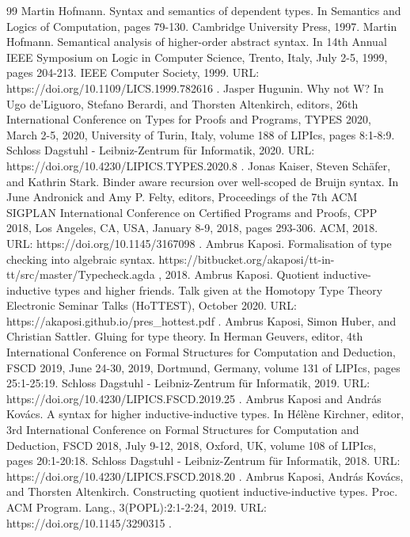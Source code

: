\documentclass[10pt,a4paper]{amsart}
\begin{document}
\begin{thebibliography}{99}
 Martin Hofmann. Syntax and semantics of dependent types. In Semantics and Logics of Computation, pages 79-130. Cambridge University Press, 1997.
 Martin Hofmann. Semantical analysis of higher-order abstract syntax. In 14th Annual IEEE Symposium on Logic in Computer Science, Trento, Italy, July 2-5, 1999, pages 204-213. IEEE Computer Society, 1999. URL: https://doi.org/10.1109/LICS.1999.782616 .
 Jasper Hugunin. Why not W? In Ugo de'Liguoro, Stefano Berardi, and Thorsten Altenkirch, editors, 26th International Conference on Types for Proofs and Programs, TYPES 2020, March 2-5, 2020, University of Turin, Italy, volume 188 of LIPIcs, pages 8:1-8:9. Schloss Dagstuhl - Leibniz-Zentrum für Informatik, 2020. URL: https://doi.org/10.4230/LIPICS.TYPES.2020.8 .
 Jonas Kaiser, Steven Schäfer, and Kathrin Stark. Binder aware recursion over well-scoped de Bruijn syntax. In June Andronick and Amy P. Felty, editors, Proceedings of the 7th ACM SIGPLAN International Conference on Certified Programs and Proofs, CPP 2018, Los Angeles, CA, USA, January 8-9, 2018, pages 293-306. ACM, 2018. URL: https://doi.org/10.1145/3167098 .
 Ambrus Kaposi. Formalisation of type checking into algebraic syntax. https://bitbucket.org/akaposi/tt-in-tt/src/master/Typecheck.agda , 2018.
 Ambrus Kaposi. Quotient inductive-inductive types and higher friends. Talk given at the Homotopy Type Theory Electronic Seminar Talks (HoTTEST), October 2020. URL: https://akaposi.github.io/pres\_hottest.pdf .
 Ambrus Kaposi, Simon Huber, and Christian Sattler. Gluing for type theory. In Herman Geuvers, editor, 4th International Conference on Formal Structures for Computation and Deduction, FSCD 2019, June 24-30, 2019, Dortmund, Germany, volume 131 of LIPIcs, pages 25:1-25:19. Schloss Dagstuhl - Leibniz-Zentrum für Informatik, 2019. URL: https://doi.org/10.4230/LIPICS.FSCD.2019.25 .
 Ambrus Kaposi and András Kovács. A syntax for higher inductive-inductive types. In Hélène Kirchner, editor, 3rd International Conference on Formal Structures for Computation and Deduction, FSCD 2018, July 9-12, 2018, Oxford, UK, volume 108 of LIPIcs, pages 20:1-20:18. Schloss Dagstuhl - Leibniz-Zentrum für Informatik, 2018. URL: https://doi.org/10.4230/LIPICS.FSCD.2018.20 .
 Ambrus Kaposi, András Kovács, and Thorsten Altenkirch. Constructing quotient inductive-inductive types. Proc. ACM Program. Lang., 3(POPL):2:1-2:24, 2019. URL: https://doi.org/10.1145/3290315 .

\end{thebibliography}
\end{document}
